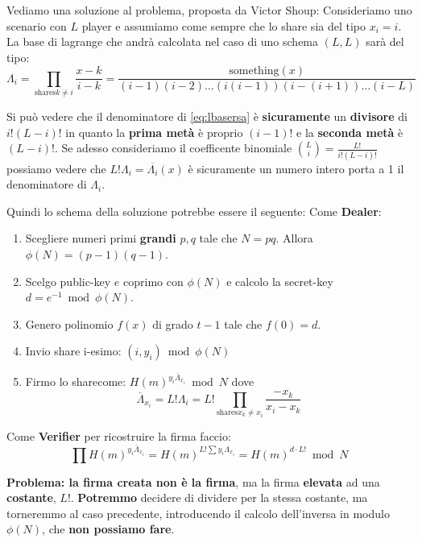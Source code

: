 Vediamo una soluzione al problema, proposta da Victor Shoup:
Consideriamo uno scenario con $L$ player e assumiamo come sempre che lo share sia del tipo $x_i=i$. La base di lagrange che andrà calcolata nel caso di uno schema $(L,L)$ sarà del tipo:
\begin{equation}\label{eq:lbasersa}
\Lambda_{i}=\prod_{\text{shares} k\ne i}\frac{x-k}{i-k}=\frac{\text{something}(x)}{(i-1)(i-2)\dots(i(i-1))(i-(i+1))\dots(i-L)}
\end{equation}
\begin{remark}
Si può vedere che il denominatore di \cref{eq:lbasersa} è \textbf{sicuramente} un \textbf{divisore} di $i!(L-i)!$ in quanto la \textbf{prima metà} è proprio $(i-1)!$ e la \textbf{seconda metà} è $(L-i)!$. Se adesso consideriamo il coefficente binomiale $\binom{L}{i}=\frac{L!}{i!(L-i)!}$ possiamo vedere che $L!\Lambda_i=\overline{\Lambda_i}(x)$ è sicuramente un numero intero porta a 1 il denominatore di $\Lambda_i$.
\end{remark}
Quindi lo schema della soluzione potrebbe essere il seguente:
Come \textbf{Dealer}:
\begin{enumerate}
    \item Scegliere numeri primi \textbf{grandi} $p,q$ tale che $N=pq$. Allora $\phi(N)=(p-1)(q-1)$.
    \item Scelgo public-key $e$ coprimo con $\phi(N)$ e calcolo la secret-key $d=e^{-1}\bmod\phi(N)$.
    \item Genero polinomio $f(x)$ di grado $t-1$ tale che $f(0)=d$.
    \item Invio share i-esimo: $(i,y_i)\bmod\phi(N)$
    \item Firmo lo share\footnotemark come: $H(m)^{y_i\overline{\Lambda}_{x_i}}\bmod N$ dove
    \[\overline{\Lambda}_{x_i}=L!\Lambda_i=L!\prod_{\text{shares} x_k\ne x_i}\frac{-x_k}{x_i-x_k}\]
\end{enumerate}
Come \textbf{Verifier} per ricostruire la firma faccio:
\[\prod H(m)^{y_i\overline{\Lambda}_{x_i}}=H(m)^{L!\sum y_i\Lambda_{x_i}}=H(m)^{d\cdot L!}\bmod{N}\]
\begin{note}
\textbf{Problema: la firma creata non è la firma}, ma la firma \textbf{elevata} ad una \textbf{costante}, $L!$. \textbf{Potremmo} decidere di dividere per la stessa costante, ma torneremmo al caso precedente, introducendo il calcolo dell'inversa in modulo $\phi(N)$, che \textbf{non possiamo fare}.\end{note}
